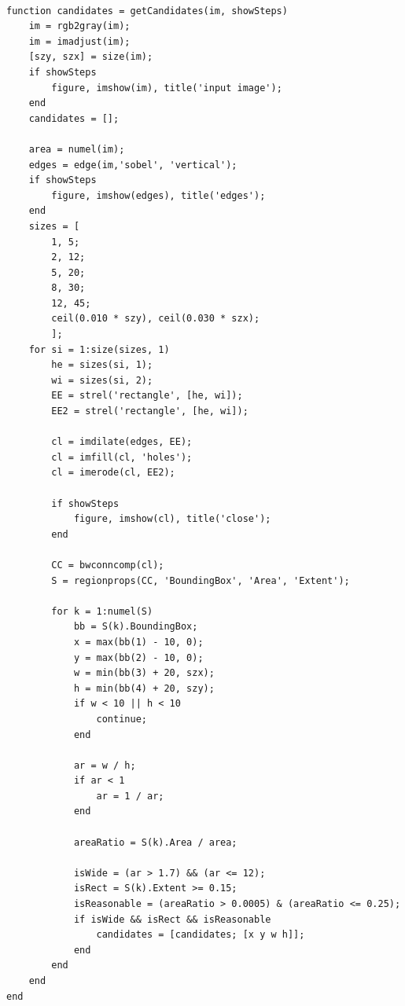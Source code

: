 \begin{verbatim}

function candidates = getCandidates(im, showSteps)
    im = rgb2gray(im);
    im = imadjust(im);
    [szy, szx] = size(im);
    if showSteps
        figure, imshow(im), title('input image');
    end
    candidates = [];
    
    area = numel(im);
    edges = edge(im,'sobel', 'vertical');
    if showSteps
        figure, imshow(edges), title('edges');
    end
    sizes = [
        1, 5;
        2, 12;
        5, 20;
        8, 30;
        12, 45;
        ceil(0.010 * szy), ceil(0.030 * szx);
        ];
    for si = 1:size(sizes, 1)
        he = sizes(si, 1);
        wi = sizes(si, 2);
        EE = strel('rectangle', [he, wi]);
        EE2 = strel('rectangle', [he, wi]);
    
        cl = imdilate(edges, EE);
        cl = imfill(cl, 'holes');
        cl = imerode(cl, EE2);
    
        if showSteps
            figure, imshow(cl), title('close');
        end
    
        CC = bwconncomp(cl);
        S = regionprops(CC, 'BoundingBox', 'Area', 'Extent'); 

        for k = 1:numel(S)
            bb = S(k).BoundingBox;
            x = max(bb(1) - 10, 0);
            y = max(bb(2) - 10, 0);
            w = min(bb(3) + 20, szx);
            h = min(bb(4) + 20, szy);
            if w < 10 || h < 10
                continue;
            end
    
            ar = w / h;
            if ar < 1
                ar = 1 / ar;
            end
    
            areaRatio = S(k).Area / area;
    
            isWide = (ar > 1.7) && (ar <= 12);
            isRect = S(k).Extent >= 0.15;
            isReasonable = (areaRatio > 0.0005) & (areaRatio <= 0.25);
            if isWide && isRect && isReasonable
                candidates = [candidates; [x y w h]];
            end
        end
    end
end

\end{verbatim}


